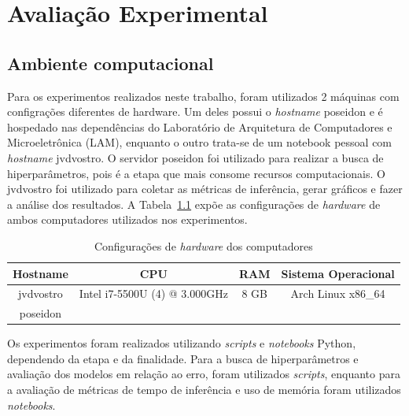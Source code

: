 \chapter{Avaliação Experimental}
\section{Ambiente computacional}
Para os experimentos realizados neste trabalho, foram utilizados 2 máquinas com configrações diferentes de hardware. Um deles possui o \textit{hostname} poseidon e é hospedado nas dependências do Laboratório de Arquitetura de Computadores e Microeletrônica (LAM), enquanto o outro trata-se de um notebook pessoal com \textit{hostname} jvdvostro. O servidor poseidon foi utilizado para realizar a busca de hiperparâmetros, pois é a etapa que mais consome recursos computacionais. O jvdvostro foi utilizado para coletar as métricas de inferência, gerar gráficos e fazer a análise dos resultados. A Tabela~\ref{tab:hardware} expõe as configurações de \textit{hardware} de ambos computadores utilizados nos experimentos.

\begin{table}[!htp] \label{tab:hardware}
    \caption{Configurações de \textit{hardware} dos computadores}
    \setlength\extrarowheight{5pt}
    \centering
    \begin{tabular}{|c|c|c|c|}
        \hline
        \rowcolor[HTML]{C0C0C0}
        Hostname  & CPU                           & RAM  & Sistema Operacional \\ \hline
        jvdvostro & Intel i7-5500U (4) @ 3.000GHz & 8 GB & Arch Linux x86\_64  \\ \hline
        poseidon  &                               &      &                     \\ \hline
    \end{tabular}
\end{table}

Os experimentos foram realizados utilizando \textit{scripts} e \textit{notebooks} Python, dependendo da etapa e da finalidade. Para a busca de hiperparâmetros e avaliação dos modelos em relação ao erro, foram utilizados \textit{scripts}, enquanto para a avaliação de métricas de tempo de inferência e uso de memória foram utilizados \textit{notebooks}.

